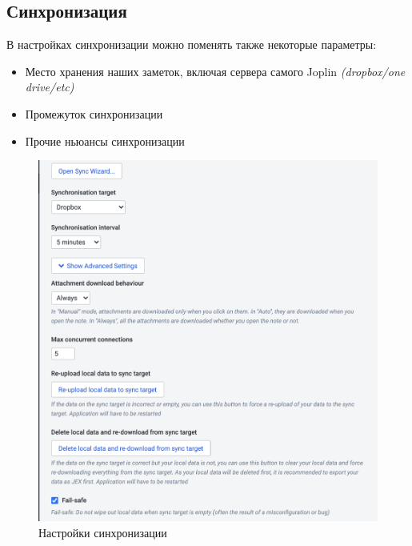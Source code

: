 \documentclass[12pt, a4paper]{article}
\begin{document}
    \newpage
    \subsection{Синхронизация}
    В настройках синхронизации можно поменять также некоторые параметры:
    \begin{itemize}
        \item Место хранения наших заметок, включая сервера самого Joplin \textit{(dropbox/one drive/etc)}
        \item Промежуток синхронизации
        \item Прочие ньюансы синхронизации
    \end{itemize}
    \begin{figure}[H]
        \centering
        \includegraphics[width=0.75\linewidth]{src/14.png}
        \caption{Настройки синхронизации}
    \end{figure}

    \newpage
\end{document}
